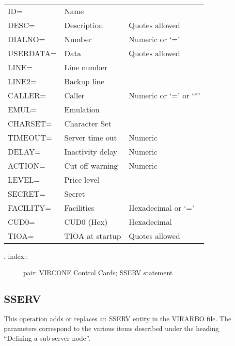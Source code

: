 \documentclass[letterpaper,10pt,english]{sphinxmanual}
\begin{document}
\begin{savenotes}\sphinxattablestart
\centering
\begin{tabulary}{\linewidth}[t]{|T|T|T|}
\hline
{}\relax &\relax &\relax \\
\hline
ID=
&
Name
&\\
\hline
DESC=
&
Description
&
Quotes allowed
\\
\hline
DIALNO=
&
Number
&
Numeric or ‘=’
\\
\hline
USERDATA=
&
Data
&
Quotes allowed
\\
\hline
LINE=
&
Line number
&\\
\hline
LINE2=
&
Backup line
&\\
\hline
CALLER=
&
Caller
&
Numeric or ‘=’ or ‘*’
\\
\hline
EMUL=
&
Emulation
&\\
\hline
CHARSET=
&
Character Set
&\\
\hline
TIMEOUT=
&
Server time out
&
Numeric
\\
\hline
DELAY=
&
Inactivity delay
&
Numeric
\\
\hline
ACTION=
&
Cut off warning
&
Numeric
\\
\hline
LEVEL=
&
Price level
&\\
\hline
SECRET=
&
Secret
&\\
\hline
FACILITY=
&
Facilities
&
Hexadecimal or ‘=’
\\
\hline
CUD0=
&
CUD0 (Hex)
&
Hexadecimal
\\
\hline
TIOA=
&
TIOA at startup
&
Quotes allowed
\\
\hline
\end{tabulary}
\par
\sphinxattableend\end{savenotes}
\begin{description}
\item[{. index::}] \leavevmode
pair: VIRCONF Control Cards; SSERV statement

\end{description}


\subsection{SSERV}
\label{\detokenize{Installation_Guide:sserv}}
This operation adds or replaces an SSERV entity in the VIRARBO file. The parameters correspond to the various items described under the heading “Defining a sub-server node”.
\end{document}

